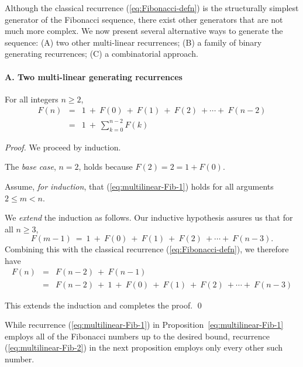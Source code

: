 Although the classical recurrence (\ref{eq:Fibonacci-defn}) is the
structurally simplest generator of the Fibonacci sequence, there exist
other generators that are not much more complex.  We now present
several alternative ways to generate the sequence: (A) two other
multi-linear recurrences; (B) a family of binary generating
recurrences; (C) a combinatorial approach.

\paragraph{A. Two multi-linear generating recurrences}


\begin{prop}
\label{thm:FiboSum-1}
For all integers $n \geq 2$,
\begin{eqnarray}
\label{eq:multilinear-Fib-1}
F(n) & = &
1 \ + \ F(0) \ + \ F(1) \ + \ F(2) \ + \cdots + \ F(n-2) \\
\nonumber
     & = &
1 \ + \ \sum_{k=0}^{n-2} F(k)
\end{eqnarray}
\end{prop}

\begin{proof}
We proceed by induction.

\noindent
The {\em base case}, $n=2$, holds because $F(2) = 2 =  1 + F(0)$.

\noindent 
Assume, {\em for induction}, that 
(\ref{eq:multilinear-Fib-1}) holds for all arguments $2 \leq m < n$.

\noindent
We {\em extend} the induction as follows.  Our inductive hypothesis
assures us that for all $n \geq 3$,
\[ F(m-1) \ = \ 1 \ + \ F(0) \ + \ F(1) \ + \ F(2) \ + \cdots + \ F(n-3). \]
Combining this with the classical recurrence
(\ref{eq:Fibonacci-defn}), we therefore have
\begin{eqnarray*}
F(n) & = & F(n-2) \ + \ F(n-1) \\
     & = &
F(n-2) \ + \ 1 \ + \ F(0) \ + \ F(1) \ + \ F(2) \ + \cdots + \ F(n-3)
\end{eqnarray*}

\noindent
This extends the induction and completes the proof.
\qed
\end{proof}

\medskip

While recurrence (\ref{eq:multilinear-Fib-1}) in
Proposition~\ref{eq:multilinear-Fib-1} employs all of the Fibonacci
numbers up to the desired bound, recurrence
(\ref{eq:multilinear-Fib-2}) in the next proposition employs only
every other such number.

